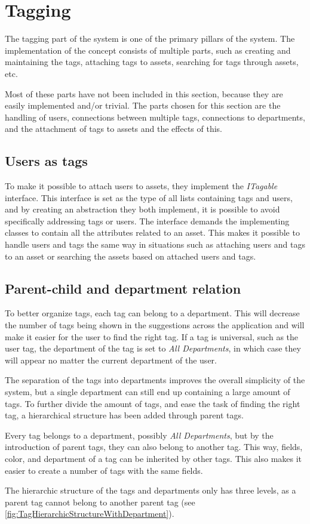 \section{Tagging}
The tagging part of the system is one of the primary pillars of the system. The implementation of the concept consists of multiple parts, such as creating and maintaining the tags, attaching tags to assets, searching for tags through assets, etc.
\par
Most of these parts have not been included in this section, because they are easily implemented and/or trivial. The parts chosen for this section are the handling of users, connections between multiple tags, connections to departments, and the attachment of tags to assets and the effects of this.

\subsection{Users as tags}
To make it possible to attach users to assets, they implement the \textit{ITagable} interface. This interface is set as the type of all lists containing tags and users, and by creating an abstraction they both implement, it is possible to avoid specifically addressing tags or users. The interface demands the implementing classes to contain all the attributes related to an asset. This makes it possible to handle users and tags the same way in situations such as attaching users and tags to an asset or searching the assets based on attached users and tags.

\subsection{Parent-child and department relation}
To better organize tags, each tag can belong to a department. This will decrease the number of tags being shown in the suggestions across the application and will make it easier for the user to find the right tag. If a tag is universal, such as the user tag, the department of the tag is set to \textit{All Departments}, in which case they will appear no matter the current department of the user.
\par
The separation of the tags into departments improves the overall simplicity of the system, but a single department can still end up containing a large amount of tags. To further divide the amount of tags, and ease the task of finding the right tag, a hierarchical structure has been added through parent tags.
\par
Every tag belongs to a department, possibly \textit{All Departments}, but by the introduction of parent tags, they can also belong to another tag. This way, fields, color, and department of a tag can be inherited by other tags. This also makes it easier to create a number of tags with the same fields.
\par
The hierarchic structure of the tags and departments only has three levels, as a parent tag cannot belong to another parent tag (see \autoref{fig:TagHierarchicStructureWithDepartment}).

